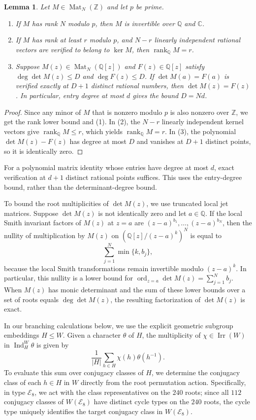 \documentclass[11pt,a4paper]{amsart}
\newtheorem{lemma}[theorem]{Lemma}
\theoremstyle{uprightdefinition}
\theoremstyle{remark}\newtheorem{remark}[theorem]{Remark}
\begin{document}
\begin{lemma}
\label{lem:exact-matrix-certificates}
Let $M\in\operatorname{Mat}_N(\mathbb Z)$ and let $p$ be prime.
\begin{enumerate}
\item If $M$ has rank $N$ modulo $p$, then $M$ is invertible over
$\mathbb Q$ and $\mathbb C$.
\item If $M$ has rank at least $r$ modulo $p$, and $N-r$ linearly
independent rational vectors are verified to belong to $\ker M$,
then $\operatorname{rank}_{\mathbb Q}M=r$.
\item Suppose $M(z)\in\operatorname{Mat}_N(\mathbb Q[z])$ and
$F(z)\in\mathbb Q[z]$ satisfy $\deg\det M(z)\le D$ and
$\deg F(z)\le D$. If
$\det M(a)=F(a)$ is verified exactly at $D+1$ distinct rational numbers,
then $\det M(z)=F(z)$. In particular, entry degree at most
$d$ gives the bound $D=Nd$.
\end{enumerate}
\end{lemma}
\begin{proof}
Since any minor of $M$ that is nonzero modulo $p$ is also nonzero over $\mathbb Z$, we get the
rank lower bound and (1). In (2), the $N-r$ linearly independent kernel vectors
give $\operatorname{rank}_{\mathbb Q}M\le r$, which yields $\operatorname{rank}_{\mathbb Q}M=r$.
In (3), the polynomial $\det M(z)-F(z)$ has degree at most $D$ and vanishes at
$D+1$ distinct points, so it is identically zero.
\end{proof}

For a polynomial matrix identity whose entries have degree at most
$d$, exact verification at $d+1$ distinct rational points suffices.
This uses the entry-degree bound, rather than the determinant-degree bound.

To bound the root multiplicities of $\det M(z)$, we use truncated local jet
matrices. Suppose $\det M(z)$ is not identically zero and let $a\in\mathbb Q$.
If the local Smith invariant factors of $M(z)$ at $z=a$ are
$(z-a)^{b_1},\ldots,(z-a)^{b_N}$, then the nullity of multiplication
by $M(z)$ on $(\mathbb Q[z]/(z-a)^k)^N$ is equal to
\[
 \sum_{j=1}^N\min\{k,b_j\},
\]
because the local Smith transformations remain invertible modulo $(z-a)^k$. In particular, this nullity is a lower bound for
$\operatorname{ord}_{z=a}\det M(z)=\sum_{j=1}^N b_j$. When $M(z)$ has monic determinant and the sum of
these lower bounds over a set of roots equals $\deg\det M(z)$, the resulting factorization of $\det M(z)$ is exact.

In our branching calculations below, we use the explicit geometric subgroup embeddings $H\le W$. Given a character $\theta$ of $H$, the multiplicity
of $\chi\in\operatorname{Irr}(W)$ in $\operatorname{Ind}_H^W\theta$ is given by
\[
 \frac1{|H|}\sum_{h\in H}\chi(h)\theta(h^{-1}).
\]
To evaluate this sum over conjugacy classes of $H$, we determine the conjugacy class of each $h\in H$ in $W$ directly from the root permutation action. Specifically, in type $\mathscr{E}_8$, we act with the class representatives on the $240$ roots; since all $112$ conjugacy classes of $W(\mathscr{E}_8)$ have distinct cycle types on the $240$ roots, the cycle type uniquely identifies the target conjugacy class in $W(\mathscr{E}_8)$.
\end{document}
